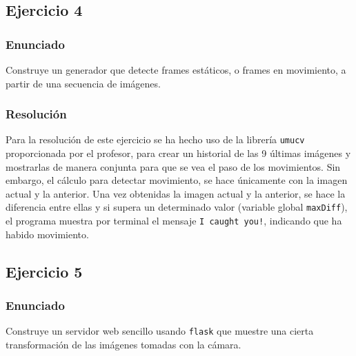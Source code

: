 \documentclass[a4paper,10pt,titlepage,oneside,openright]{book}
\begin{document}
\medskip
\subsection{Ejercicio 4}

\subsubsection*{Enunciado}
Construye un generador que detecte frames estáticos, o frames en movimiento, a partir de una secuencia de imágenes.

\subsubsection*{Resolución}
Para la resolución de este ejercicio se ha hecho uso de la librería \texttt{umucv} proporcionada por el profesor, para crear un historial de las 9 últimas imágenes y mostrarlas de manera conjunta para que se vea el paso de los movimientos. Sin embargo, el cálculo para detectar movimiento, se hace únicamente con la imagen actual y la anterior. Una vez obtenidas la imagen actual y la anterior, se hace la diferencia entre ellas y si supera un determinado valor (variable global \texttt{maxDiff}), el programa muestra por terminal el mensaje \texttt{I caught you!}, indicando que ha habido movimiento.


\medskip
\subsection{Ejercicio 5}

\subsubsection*{Enunciado}
Construye un servidor web sencillo usando \texttt{flask} que muestre una cierta transformación de las imágenes tomadas con la cámara.

\end{document}

